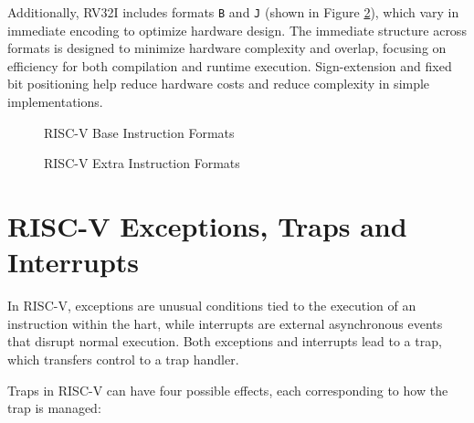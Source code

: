 Additionally, RV32I includes formats \texttt{B} and \texttt{J} (shown in Figure
\ref{fig:extrainstrformats}), which vary in immediate encoding to optimize
hardware design. The immediate structure across formats is designed to minimize hardware
complexity and overlap, focusing on efficiency for both compilation and runtime
execution. Sign-extension and fixed bit positioning help reduce hardware costs and
reduce complexity in simple implementations.

\begin{figure}[htbp]
  \centering
  \def\stackalignment{r}
  {\scriptsize }
  \caption{RISC-V Base Instruction Formats}
  \label{fig:instrformats}
\end{figure}

\begin{figure}[htbp]
  \centering
  \def\stackalignment{r} %
  {\scriptsize }
  \caption{RISC-V Extra Instruction Formats}
  \label{fig:extrainstrformats}
\end{figure}

\section{RISC-V Exceptions, Traps and Interrupts}
\label{sec:riscv_eti}

In RISC-V, exceptions are unusual conditions tied to the execution of an instruction
within the hart, while interrupts are external asynchronous events that disrupt
normal execution. Both exceptions and interrupts lead to a trap, which transfers
control to a trap handler.

Traps in RISC-V can have four possible effects, each corresponding to how the trap
is managed:

